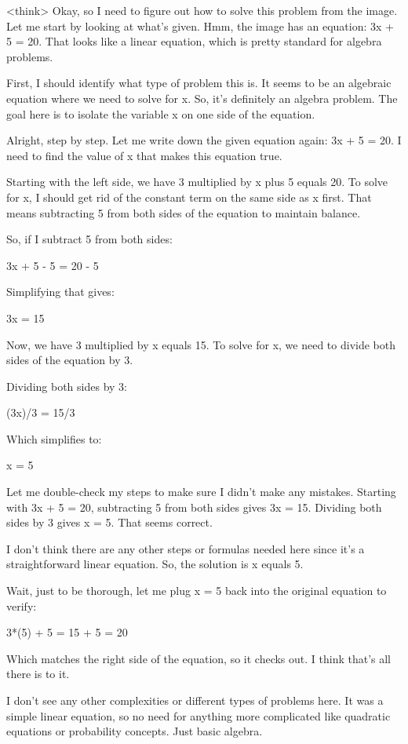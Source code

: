 <think>
Okay, so I need to figure out how to solve this problem from the image. Let me start by looking at what's given. Hmm, the image has an equation: 3x + 5 = 20. That looks like a linear equation, which is pretty standard for algebra problems.

First, I should identify what type of problem this is. It seems to be an algebraic equation where we need to solve for x. So, it's definitely an algebra problem. The goal here is to isolate the variable x on one side of the equation.

Alright, step by step. Let me write down the given equation again: 3x + 5 = 20. I need to find the value of x that makes this equation true.

Starting with the left side, we have 3 multiplied by x plus 5 equals 20. To solve for x, I should get rid of the constant term on the same side as x first. That means subtracting 5 from both sides of the equation to maintain balance.

So, if I subtract 5 from both sides: 

3x + 5 - 5 = 20 - 5

Simplifying that gives:

3x = 15

Now, we have 3 multiplied by x equals 15. To solve for x, we need to divide both sides of the equation by 3.

Dividing both sides by 3:

(3x)/3 = 15/3

Which simplifies to:

x = 5

Let me double-check my steps to make sure I didn't make any mistakes. Starting with 3x + 5 = 20, subtracting 5 from both sides gives 3x = 15. Dividing both sides by 3 gives x = 5. That seems correct.

I don't think there are any other steps or formulas needed here since it's a straightforward linear equation. So, the solution is x equals 5.

Wait, just to be thorough, let me plug x = 5 back into the original equation to verify:

3*(5) + 5 = 15 + 5 = 20

Which matches the right side of the equation, so it checks out. I think that's all there is to it.

I don't see any other complexities or different types of problems here. It was a simple linear equation, so no need for anything more complicated like quadratic equations or probability concepts. Just basic algebra.

